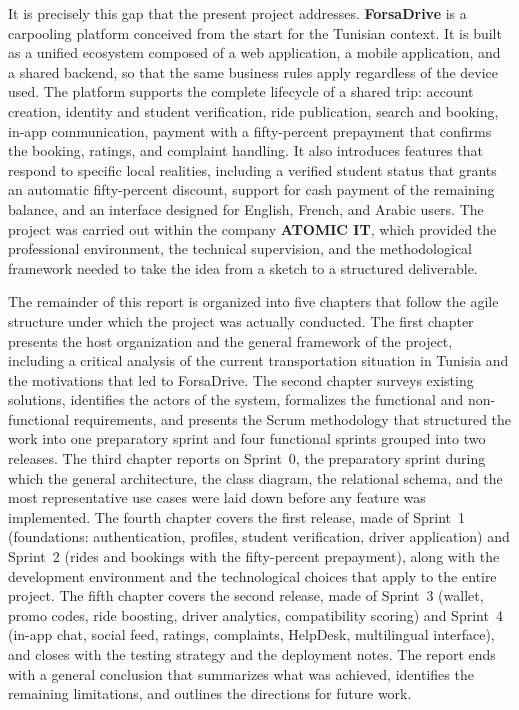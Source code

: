 It is precisely this gap that the present project addresses. \textbf{ForsaDrive} is a carpooling platform conceived from the start for the Tunisian context. It is built as a unified ecosystem composed of a web application, a mobile application, and a shared backend, so that the same business rules apply regardless of the device used. The platform supports the complete lifecycle of a shared trip: account creation, identity and student verification, ride publication, search and booking, in-app communication, payment with a fifty-percent prepayment that confirms the booking, ratings, and complaint handling. It also introduces features that respond to specific local realities, including a verified student status that grants an automatic fifty-percent discount, support for cash payment of the remaining balance, and an interface designed for English, French, and Arabic users. The project was carried out within the company \textbf{ATOMIC IT}, which provided the professional environment, the technical supervision, and the methodological framework needed to take the idea from a sketch to a structured deliverable.

The remainder of this report is organized into five chapters that follow the agile structure under which the project was actually conducted. The first chapter presents the host organization and the general framework of the project, including a critical analysis of the current transportation situation in Tunisia and the motivations that led to ForsaDrive. The second chapter surveys existing solutions, identifies the actors of the system, formalizes the functional and non-functional requirements, and presents the Scrum methodology that structured the work into one preparatory sprint and four functional sprints grouped into two releases. The third chapter reports on Sprint~0, the preparatory sprint during which the general architecture, the class diagram, the relational schema, and the most representative use cases were laid down before any feature was implemented. The fourth chapter covers the first release, made of Sprint~1 (foundations: authentication, profiles, student verification, driver application) and Sprint~2 (rides and bookings with the fifty-percent prepayment), along with the development environment and the technological choices that apply to the entire project. The fifth chapter covers the second release, made of Sprint~3 (wallet, promo codes, ride boosting, driver analytics, compatibility scoring) and Sprint~4 (in-app chat, social feed, ratings, complaints, HelpDesk, multilingual interface), and closes with the testing strategy and the deployment notes. The report ends with a general conclusion that summarizes what was achieved, identifies the remaining limitations, and outlines the directions for future work.